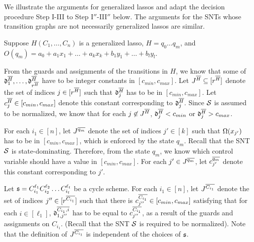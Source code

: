 \begin{appendix}
We illustrate the arguments for generalized lassos and adapt the decision procedure Step I-III to Step I$''$-III$''$ below. The arguments for the SNTs whose transition graphs are not necessarily generalized lassos are similar.

Suppose $H (C_1, \dots, C_n)$ is a generalized lasso, $H=q_0 \dots q_m$, and $O(q_m)=a_0 + a_1 x_1 + \dots + a_k x_k + b_1 y_1 + \dots + b_l y_l$.

From the guards and assignments of the transitions in $H$, we know that some of $\mathfrak{d}^{\overline{H}}_1,\dots, \mathfrak{d}^{\overline{H}}_{r^{\overline{H}}}$ have to be integer constants in $[c_{min}, c_{max}]$. Let $J^{\overline{H}} \subseteq [r^{\overline{H}}]$ denote the set of indices $j \in [r^{\overline{H}}]$ such that $\mathfrak{d}^{\overline{H}}_j$ has to be in $[c_{min}, c_{max}]$. Let $c^{\overline{H}}_j \in [c_{min}, c_{max}]$ denote this constant corresponding to $\mathfrak{d}^{\overline{H}}_j$. Since ${\mathcal{S} }$ is assumed to be normalized, we know that for each $j \not \in J^{\overline{H}}$,  $\mathfrak{d}^{\overline{H}}_j < c_{min}$ or $\mathfrak{d}^{\overline{H}}_j > c_{max}$.
%
%
%
%
\smallskip\\
\bigskip

For each $i_1 \in [n]$, let $J^{\overline{q_m}}$ denote the set of indices $j' \in [k]$ such that $\Omega(x_{j'})$ has to be in $[c_{min}, c_{max}]$, which is enforced by the state $q_m$. Recall that the SNT ${\mathcal{S} }$ is state-dominating. Therefore, from the state $q_m$, we know which control variable should have a value in $[c_{min},c_{max}]$. For each $j' \in J^{\overline{q_m}}$, let $c^{\overline{q_m}}_{j'}$ denote this constant corresponding to $j'$. 

Let ${\mathfrak{s} }=C_{i_1}^{\ell_1} C^{\ell_2}_{i_2} \dots C^{\ell_t}_{i_t}$ be a cycle scheme. 
For each $i_1 \in [n]$, let $J^{\overline{C_{i_1}}}$ denote the set of indices $j'' \in [r^{\overline{C_{i_1}}}]$ such that there is $c^{\overline{C_{i_1}}}_{j''} \in [c_{min}, c_{max}]$ satisfying that for each $i \in [\ell_1]$, $\mathfrak{d}^{\overline{C_{i_1}, i}}_{1, j''}$ has to be equal to $c^{\overline{C_{i_1}}}_{j''}$, as a result of the guards and assignments on $C_{i_1}$. (Recall that the SNT ${\mathcal{S} }$ is required to be normalized). Note that the definition of $J^{\overline{C_{i_1}}}$ is independent of the choices of ${\mathfrak{s} }$.


\end{appendix}
